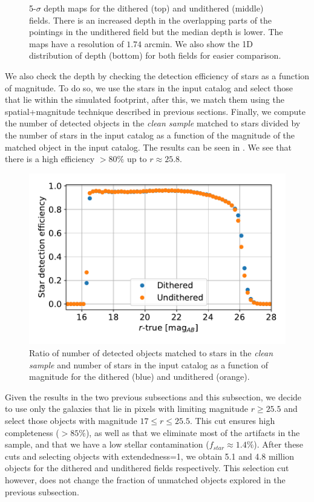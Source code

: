 \documentclass[twocolumn]{aastex62}
\begin{document}
\begin{figure}
\caption{5-$\sigma$ depth maps for the dithered (top) and undithered (middle) fields. There is an increased depth in the overlapping parts of the pointings in the undithered field but the median depth is lower. The maps have a resolution of $1.74$ arcmin. We also show the 1D distribution of depth (bottom) for both fields for easier comparison.}
\label{fig:depth_maps}
\end{figure}

We also check the depth by checking the detection efficiency of stars as a function of magnitude. To do so, we use the stars in the input catalog and select those that lie within the simulated footprint, after this, we match them using the spatial+magnitude technique described in previous sections. Finally, we compute the number of detected objects in the \textit{clean sample} matched to stars divided by the number of stars in the input catalog as a function of the magnitude of the matched object in the input catalog. The results can be seen in . We see that there is a high efficiency $> 80\%$ up to $r \approx 25.8$. 
\begin{figure}
\centering
\includegraphics[width=0.9\columnwidth]{stellar_detection_efficiency.pdf}
\caption{Ratio of number of detected objects matched to stars in the \textit{clean sample} and number of stars in the input catalog as a function of magnitude for the dithered (blue) and undithered (orange).}
\label{fig:stellar_detection_efficiency}
\end{figure}

Given the results in the two previous subsections and this subsection, we decide to use only the galaxies that lie in pixels with limiting magnitude $r \geq 25.5$ and select those objects with magnitude $17 \leq r \leq 25.5$. This cut ensures high completeness ($>85\%$), as well as that we eliminate most of the artifacts in the sample, and that we have a low stellar contamination ($f_{star} \approx 1.4\%$). After these cuts and selecting objects with extendedness=1, we obtain 5.1 and 4.8 million objects for the dithered and undithered fields respectively. This selection cut however, does not change the fraction of unmatched objects explored in the previous subsection.
\end{document}
